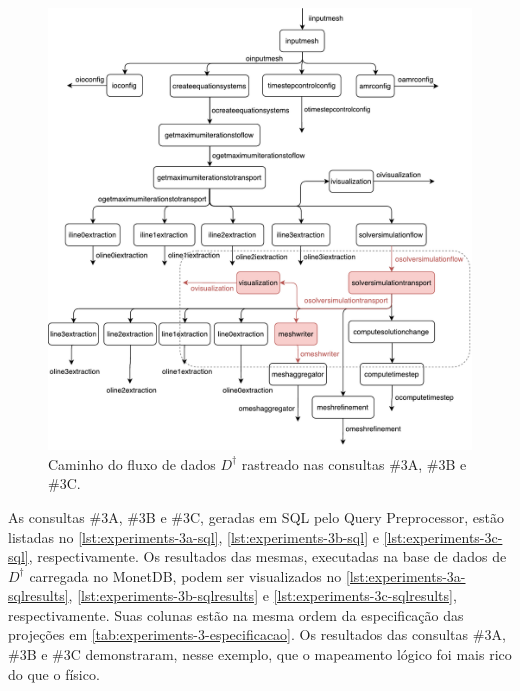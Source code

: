 \begin{figure}[htb]
    \centering
    \includegraphics[width=\textwidth]{img/experiments-dataflow-3}
    \caption[Caminho do fluxo de dados \(D^{\dagger}\) rastreado nas consultas \#3A, \#3B e \#3C]{Caminho do fluxo de dados \(D^{\dagger}\) rastreado nas consultas \#3A, \#3B e \#3C.}%
    \label{fig:experiments-dataflow-3}
\end{figure}

As consultas \#3A, \#3B e \#3C, geradas em SQL pelo Query Preprocessor, estão listadas no \autoref{lst:experiments-3a-sql}, \autoref{lst:experiments-3b-sql} e \autoref{lst:experiments-3c-sql}, respectivamente. Os resultados das mesmas, executadas na base de dados de \(D^{\dagger}\) carregada no MonetDB, podem ser visualizados no \autoref{lst:experiments-3a-sqlresults}, \autoref{lst:experiments-3b-sqlresults} e \autoref{lst:experiments-3c-sqlresults}, respectivamente. Suas colunas estão na mesma ordem da especificação das projeções em \autoref{tab:experiments-3-especificacao}. Os resultados das consultas \#3A, \#3B e \#3C demonstraram, nesse exemplo, que o mapeamento lógico foi mais rico do que o físico.

